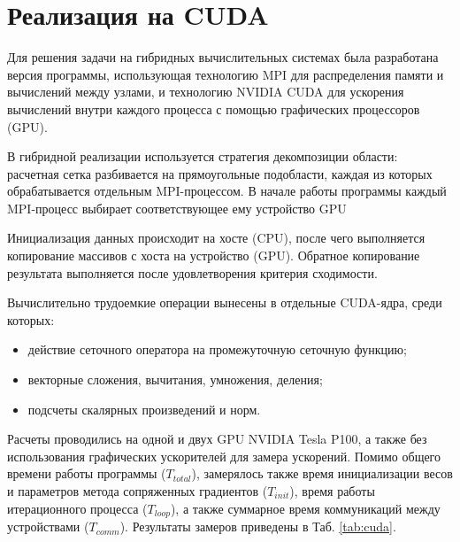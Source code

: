 \documentclass[12pt,a4paper]{article}
\begin{document}
    \section{Реализация на CUDA}

    Для решения задачи на гибридных вычислительных системах была разработана версия программы, использующая технологию MPI для распределения памяти и вычислений между узлами, и технологию NVIDIA CUDA для ускорения вычислений внутри каждого процесса с помощью графических процессоров (GPU).

    В гибридной реализации используется стратегия декомпозиции области: расчетная сетка разбивается на прямоугольные подобласти, каждая из которых обрабатывается отдельным MPI-процессом. В начале работы программы каждый MPI-процесс выбирает соответствующее ему устройство GPU
    
    Инициализация данных происходит на хосте (CPU), после чего выполняется копирование массивов с хоста на устройство (GPU). Обратное копирование результата выполняется после удовлетворения критерия сходимости.

    Вычислительно трудоемкие операции вынесены в отдельные CUDA-ядра, среди которых:

    \begin{itemize}
        \item действие сеточного оператора на промежуточную сеточную функцию;
        \item векторные сложения, вычитания, умножения, деления;
        \item подсчеты скалярных произведений и норм.
    \end{itemize}

    Расчеты проводились на одной и двух GPU NVIDIA Tesla P100, а также без использования графических ускорителей для замера ускорений. Помимо общего времени работы программы (\(T_{total}\)), замерялось также время инициализации весов и параметров метода сопряженных градиентов (\(T_{init}\)), время работы итерационного процесса (\(T_{loop}\)), а также суммарное время коммуникаций между устройствами (\(T_{comm}\)). Результаты замеров приведены в Таб. \ref{tab:cuda}.
\end{document}
